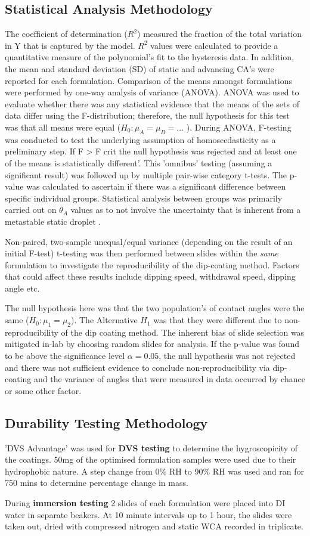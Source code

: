 \subsection{Statistical Analysis Methodology}
The coefficient of determination ($R^2$) measured the fraction of the total variation in Y that is captured by the model. $R^2$ values were calculated to provide a quantitative measure of the polynomial's fit to the hysteresis data. In addition, the mean and standard deviation (SD) of static and advancing CA's were reported for each formulation. Comparison of the means amongst formulations were performed by one-way analysis of variance (ANOVA). ANOVA was used to evaluate whether there was any statistical evidence that the means of the sets of data differ using the F-distribution; therefore, the null hypothesis for this test was that all means were equal ($H_0: \mu_A = \mu_B =...$ ). During ANOVA, F-testing was conducted to test the underlying assumption of homoscedasticity as a preliminary step. If F > F crit  the null hypothesis was rejected and at least one of the means is statistically different'. This 'omnibus' testing (assuming a significant result) was followed up by multiple pair-wise category t-tests. The p-value was calculated to ascertain if there was a significant difference between specific individual groups. Statistical analysis between groups was primarily carried out on $\theta_A$ values as to not involve the uncertainty that is inherent from a metastable static droplet . 
\par Non-paired, two-sample unequal/equal variance (depending on the result of an initial F-test) t-testing was then performed between slides within the \emph{same} formulation to investigate the reproducibility of the dip-coating method. Factors that could affect these results include dipping speed, withdrawal speed, dipping angle etc. 
\par The null hypothesis here was that the two population’s of contact angles were the same ($H_0:\mu_1 = \mu_2$). The Alternative $H_1$ was that they were different due to non-reproducibility of the dip coating method. The inherent bias of slide selection was mitigated in-lab by choosing random slides for analysis. If the p-value was found to be above the significance level $\alpha = 0.05$, the null hypothesis was not rejected and there was not sufficient evidence to conclude non-reproducibility via dip-coating and the variance of angles that were measured in data occurred by chance or some other factor.
\subsection{Durability Testing Methodology}
'DVS Advantage' was used for \textbf{DVS testing} to determine the hygroscopicity of the coatings. 50mg of the optimised formulation samples were used due to their hydrophobic nature. A step change from 0\% RH to 90\% RH was used and ran for 750 mins to determine percentage change in mass. 
\par During \textbf{immersion testing} 2 slides of each formulation were placed into DI water in separate beakers. At 10 minute intervals up to 1 hour, the slides were taken out, dried with compressed nitrogen and static WCA recorded in triplicate. 

